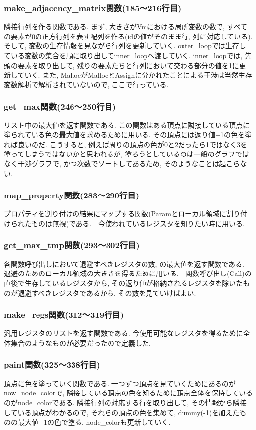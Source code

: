 \documentclass{jarticle}
\begin{document}
\subsubsection{make\_adjacency\_matrix関数(185〜216行目)}
隣接行列を作る関数である. まず, 大きさがVmにおける局所変数の数で, すべての要素が0の正方行列を表す配列を作る(idの値がそのまま行, 列に対応している). そして, 変数の生存情報を見ながら行列を更新していく. outer\_loopでは生存している変数の集合を順に取り出してinner\_loopへ渡していく. inner\_loopでは, 先頭の要素を取り出して, 残りの要素たちと行列において交わる部分の値を1に更新していく. また, MallocがMallocとAssignに分かれたことによる干渉は当然生存変数解析で解析されていないので, ここで行っている. 
\subsubsection{get\_max関数(246〜250行目)}
リスト中の最大値を返す関数である. この関数はある頂点に隣接している頂点に塗られている色の最大値を求めるために用いる. その頂点には返り値+1の色を塗れば良いのだ. こうすると, 例えば周りの頂点の色が0と2だったら1ではなく3を塗ってしまうではないかと思われるが, 塗ろうとしているのは一般のグラフではなく干渉グラフで, かつ次数でソートしてあるため, そのようなことは起こらない.
\subsubsection{map\_property関数(283〜290行目)}
プロパティを割り付けの結果にマップする関数(Paramとローカル領域に割り付けられたものは無視)である.　今使われているレジスタを知りたい時に用いる.
\subsubsection{get\_max\_tmp関数(293〜302行目)}
各関数呼び出しにおいて退避すべきレジスタの数, の最大値を返す関数である. 退避のためのローカル領域の大きさを得るために用いる.　関数呼び出し(Call)の直後で生存しているレジスタから, その返り値が格納されるレジスタを除いたものが退避すべきレジスタであるから, その数を見ていけばよい.
\subsubsection{make\_regs関数(312〜319行目)}
汎用レジスタのリストを返す関数である. 今使用可能なレジスタを得るために全体集合のようなものが必要だったので定義した.
\subsubsection{paint関数(325〜338行目)}
頂点に色を塗っていく関数である. 一つずつ頂点を見ていくためにあるのがnow\_node\_colorで, 隣接している頂点の色を知るために頂点全体を保持しているのがnode\_colorである. 隣接行列の対応する行を取り出して, その情報から隣接している頂点がわかるので, それらの頂点の色を集めて, dummy(-1)を加えたものの最大値+1の色で塗る. node\_colorも更新していく.
\end{document}
